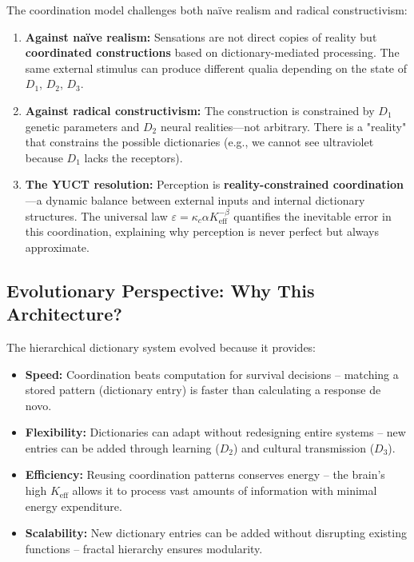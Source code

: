 \documentclass[12pt,a4paper]{article}
\newcommand{\eff}{\mathrm{eff}}
\newcommand{\Ke}{K_{\eff}}
\begin{document}
	The coordination model challenges both naïve realism and radical constructivism:
	
	\begin{enumerate}
		\item \textbf{Against naïve realism:} Sensations are not direct copies of reality but \textbf{coordinated constructions} based on dictionary-mediated processing. The same external stimulus can produce different qualia depending on the state of $D_1$, $D_2$, $D_3$.
		
		\item \textbf{Against radical constructivism:} The construction is constrained by $D_1$ genetic parameters and $D_2$ neural realities—not arbitrary. There is a "reality" that constrains the possible dictionaries (e.g., we cannot see ultraviolet because $D_1$ lacks the receptors).
		
		\item \textbf{The YUCT resolution:} Perception is \textbf{reality-constrained coordination}—a dynamic balance between external inputs and internal dictionary structures. The universal law $\varepsilon = \kappa_c \alpha \Ke^{-\beta}$ quantifies the inevitable error in this coordination, explaining why perception is never perfect but always approximate.
	\end{enumerate}
	
	\subsection{Evolutionary Perspective: Why This Architecture?}
	
	The hierarchical dictionary system evolved because it provides:
	
	\begin{itemize}
		\item \textbf{Speed:} Coordination beats computation for survival decisions – matching a stored pattern (dictionary entry) is faster than calculating a response de novo.
		\item \textbf{Flexibility:} Dictionaries can adapt without redesigning entire systems – new entries can be added through learning ($D_2$) and cultural transmission ($D_3$).
		\item \textbf{Efficiency:} Reusing coordination patterns conserves energy – the brain's high $\Ke$ allows it to process vast amounts of information with minimal energy expenditure.
		\item \textbf{Scalability:} New dictionary entries can be added without disrupting existing functions – fractal hierarchy ensures modularity.
	\end{itemize}
	
\end{document}
